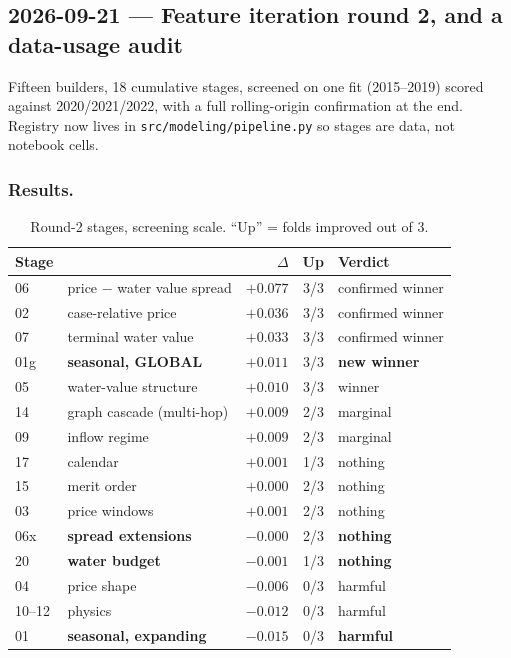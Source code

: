 \subsection{2026-09-21 --- Feature iteration round 2, and a data-usage audit}
\label{sec:feature-iter-2}

Fifteen builders, 18 cumulative stages, screened on one fit (2015--2019) scored against
2020/2021/2022, with a full rolling-origin confirmation at the end. Registry now lives in
\texttt{src/modeling/pipeline.py} so stages are data, not notebook cells.

\subsubsection*{Results.}

\begin{table}[htbp]
  \centering
  \caption{Round-2 stages, screening scale. ``Up'' = folds improved out of 3.}
  \label{tab:feature-iter-2}
  \begin{tabular}{llrr l}
    \toprule
    Stage & & $\Delta$ & Up & Verdict \\
    \midrule
    06 & price $-$ water value spread & $+0.077$ & 3/3 & confirmed winner \\
    02 & case-relative price          & $+0.036$ & 3/3 & confirmed winner \\
    07 & terminal water value         & $+0.033$ & 3/3 & confirmed winner \\
    01g& \textbf{seasonal, GLOBAL}    & $+0.011$ & 3/3 & \textbf{new winner} \\
    05 & water-value structure        & $+0.010$ & 3/3 & winner \\
    14 & graph cascade (multi-hop)    & $+0.009$ & 2/3 & marginal \\
    09 & inflow regime                & $+0.009$ & 2/3 & marginal \\
    17 & calendar                     & $+0.001$ & 1/3 & nothing \\
    15 & merit order                  & $+0.000$ & 2/3 & nothing \\
    03 & price windows                & $+0.001$ & 2/3 & nothing \\
    06x& \textbf{spread extensions}   & $-0.000$ & 2/3 & \textbf{nothing} \\
    20 & \textbf{water budget}        & $-0.001$ & 1/3 & \textbf{nothing} \\
    04 & price shape                  & $-0.006$ & 0/3 & harmful \\
    10--12 & physics                  & $-0.012$ & 0/3 & harmful \\
    01 & \textbf{seasonal, expanding} & $-0.015$ & 0/3 & \textbf{harmful} \\
    \bottomrule
  \end{tabular}
\end{table}

